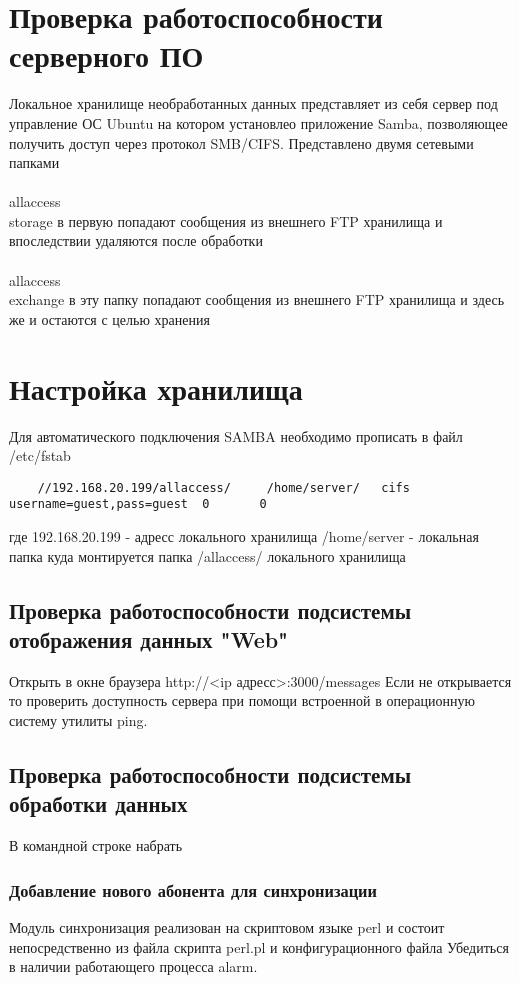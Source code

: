 \documentclass[12pt]{article}[a4paper,14pt,russian]
\begin{document}
	\section{Проверка работоспособности серверного ПО}
	Локальное хранилище необработанных данных представляет из себя сервер под управление ОС Ubuntu на котором установлео приложение Samba, позволяющее  получить доступ через протокол SMB/CIFS. Представлено двумя сетевыми папками
	\\<ip адрес сервера>\\allaccess\\storage
	в первую попадают сообщения из внешнего FTP хранилища и впоследствии удаляются после обработки
	\\<ip адрес сервера>\\allaccess\\exchange
	в эту папку попадают сообщения из внешнего FTP хранилища и здесь же и остаются
	с целью хранения
	\section{Настройка хранилища}
	Для автоматического подключения SAMBA необходимо прописать в файл
	/etc/fstab
	\begin{verbatim}
	//192.168.20.199/allaccess/     /home/server/   cifs username=guest,pass=guest  0       0
	\end{verbatim}
	где 192.168.20.199 - адресс локального хранилища
	/home/server - локальная папка куда монтируется папка /allaccess/ локального хранилища
	\subsection{Проверка работоспособности подсистемы отображения данных "Web"}
	Открыть в окне браузера http://<ip адресс>:3000/messages
	Если не открывается то проверить доступность сервера при
	помощи встроенной в операционную систему утилиты ping.
	
    \subsection{Проверка работоспособности подсистемы обработки данных}
    В командной строке набрать 
    \subsubsection{Добавление нового абонента для синхронизации}
    Модуль синхронизация реализован на скриптовом языке perl и состоит непосредственно
    из файла скрипта perl.pl и конфигурационного файла
    Убедиться в наличии работающего процесса alarm.
    
\end{document}
